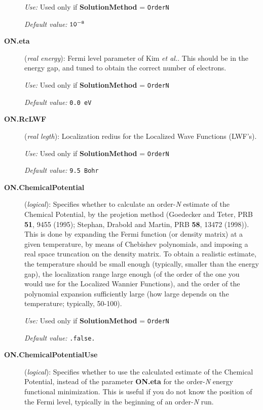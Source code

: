 \begin{description}
{\it Use:} Used only if {\bf SolutionMethod} = {\tt OrderN}

{\it Default value:} ${\tt 10^{-8}}$

\item[{\bf ON.eta}] ({\it real energy}): 
Fermi level parameter of Kim 
{\it et al.}. This should be in the energy gap, and tuned to obtain
the correct number of electrons.

{\it Use:} Used only if {\bf SolutionMethod} = {\tt OrderN}

{\it Default value:} {\tt 0.0 eV}

\item[{\bf ON.RcLWF}] ({\it real legth}): 
Localization redius for the Localized Wave Functions (LWF's).

{\it Use:} Used only if  {\bf SolutionMethod} = {\tt OrderN}

{\it Default value:} {\tt 9.5 Bohr}
        
\item[{\bf ON.ChemicalPotential}] ({\it logical}): 
Specifies whether to calculate an order-{\it N} estimate of the
Chemical Potential, by the projetion method 
(Goedecker and Teter, PRB {\bf 51}, 9455 (1995); 
Stephan, Drabold and Martin, PRB {\bf 58}, 13472 
(1998)). This is
done by expanding the Fermi function (or density matrix)
at a given temperature, by means of Chebishev
polynomials, and imposing a
real space truncation on the density matrix.
To obtain a realistic estimate, the temperature 
should be small enough (typically, smaller than
the energy gap), the localization range large enough
(of the order of the one you would use for the Localized Wannier
Functions), and the order of the polynomial expansion
sufficiently large (how large depends on the temperature; 
typically, 50-100).

{\it Use:} Used only if {\bf SolutionMethod} = {\tt OrderN}

{\it Default value:} {\tt .false.}

\item[{\bf ON.ChemicalPotentialUse}] ({\it logical}): 
Specifies whether to use the calculated estimate of the
Chemical Potential, instead of the parameter 
{\bf ON.eta} 
for the order-{\it N} energy functional minimization.
This is useful if you do not know the position
of the Fermi level, typically in the beginning
of an order-{\em N} run.


\end{description}
